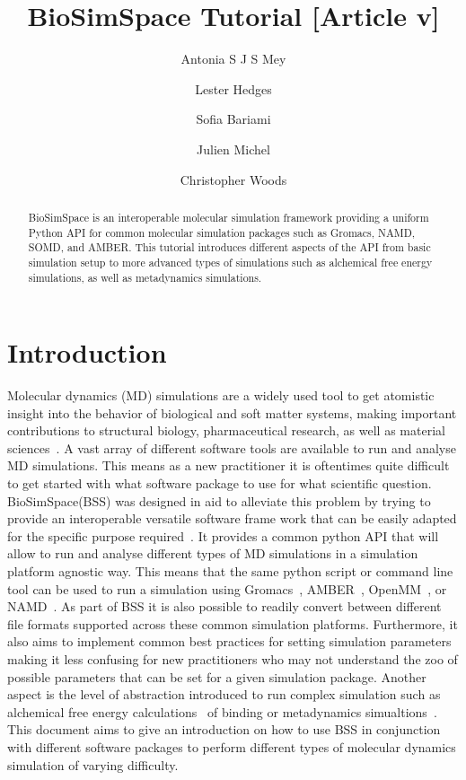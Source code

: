 \documentclass[9pt,tutorial]{livecoms}
\title{BioSimSpace Tutorial [Article v\versionnumber]}
\author[1*]{Antonia S J S Mey}
\author[2]{Lester Hedges}
\author[1]{Sofia Bariami}
\author[1]{Julien Michel}
\author[2]{Christopher Woods}
\affil[1]{Edinburgh}
\affil[2]{Institution 2}
\begin{document}
\begin{frontmatter}
\maketitle

\begin{abstract}
BioSimSpace is an interoperable molecular simulation framework providing a uniform Python API for common molecular simulation packages such as Gromacs, NAMD, SOMD, and AMBER. This tutorial introduces different aspects of the API from basic simulation setup to more advanced types of simulations such as alchemical free energy simulations, as well as metadynamics simulations. 
\end{abstract}

\end{frontmatter}



\section{Introduction}
\label{sec:intro}
Molecular dynamics (MD) simulations are a widely used tool to get atomistic insight into the behavior of biological and soft matter systems, making important contributions to structural biology, pharmaceutical research, as well as material sciences~\cite{huggins2019biomolecular, rountree2002atomistic}. A vast array of different software tools are available to run and analyse MD simulations. This means as a new practitioner it is oftentimes quite difficult to get started with what software package to use for what scientific question. 
BioSimSpace(BSS) was designed in aid to alleviate this problem by trying to provide an interoperable versatile software frame work that can be easily adapted for the specific purpose required~\cite{hedges2019biosimspace}. It provides a common python API that will allow to run and analyse different types of MD simulations in a simulation platform agnostic way. This means that the same python script or command line tool can be used to run a simulation using Gromacs~\cite{vanderspoel2005gromacs}, AMBER~\cite{}, OpenMM~\cite{eastman2017openmm}, or NAMD~\cite{phillips2005scalable}. As part of BSS it is also possible to readily convert between different file formats supported across these common simulation platforms. Furthermore, it also aims to implement common best practices for setting simulation parameters making it less confusing for new practitioners who may not understand the zoo of possible parameters that can be set for a given simulation package. Another aspect is the level of abstraction introduced to run complex simulation such as alchemical free energy calculations~\cite{} of binding or metadynamics simualtions~\cite{}. This document aims to give an introduction on how to use BSS in conjunction with different software packages to perform different types of molecular dynamics simulation of varying difficulty.
\end{document}
